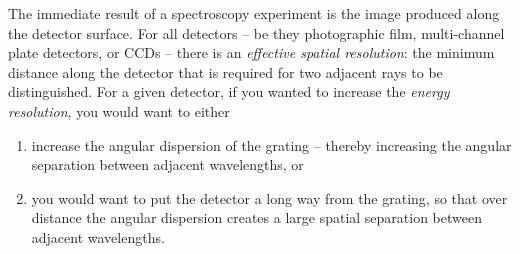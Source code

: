 The immediate result of a spectroscopy experiment is the image produced along the detector surface.  For all detectors -- be they photographic film, multi-channel plate detectors, or CCDs -- there is an \emph{effective spatial resolution}: the minimum distance along the detector that is required for two adjacent rays to be distinguished.  For a given detector, if you wanted to increase the \emph{energy resolution}, you would want to either 
\begin{enumerate}
\item increase the angular dispersion of the grating -- thereby increasing the angular separation between adjacent wavelengths, or 
\item you would want to put the detector a long way from the grating, so that over distance the angular dispersion creates a large spatial separation between adjacent wavelengths.
\end{enumerate}

